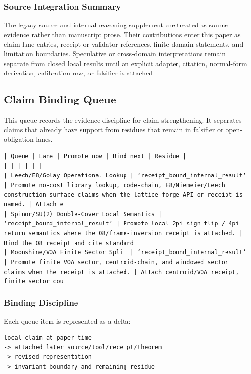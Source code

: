 \documentclass[11pt]{article}
\begin{document}
\subsubsection*{Source Integration Summary}

The legacy source and internal reasoning supplement are treated as source
evidence rather than manuscript prose. Their contributions enter this paper as
claim-lane entries, receipt or validator references, finite-domain statements,
and limitation boundaries. Speculative or cross-domain interpretations remain
separate from closed local results until an explicit adapter, citation,
normal-form derivation, calibration row, or falsifier is attached.
\subsection*{Claim Binding Queue}

This queue records the evidence discipline for claim strengthening. It separates claims that already have support from residues that remain in falsifier or open-obligation lanes.

\noindent\texttt{| Queue | Lane | Promote now | Bind next | Residue |}\\
\noindent\texttt{|---|---|---|---|---|}\\
\noindent\texttt{| Leech/E8/Golay Operational Lookup | `receipt\_bound\_internal\_result` | Promote no-cost library lookup, code-chain, E8/Niemeier/Leech construction-surface claims when the lattice-forge API or receipt is named. | Attach e}\\
\noindent\texttt{| Spinor/SU(2) Double-Cover Local Semantics | `receipt\_bound\_internal\_result` | Promote local 2pi sign-flip / 4pi return semantics where the O8/frame-inversion receipt is attached. | Bind the O8 receipt and cite standard}\\
\noindent\texttt{| Moonshine/VOA Finite Sector Split | `receipt\_bound\_internal\_result` | Promote finite VOA sector, centroid-chain, and windowed sector claims when the receipt is attached. | Attach centroid/VOA receipt, finite sector cou}\\

\subsubsection*{Binding Discipline}

Each queue item is represented as a delta:

\begin{verbatim}
local claim at paper time
-> attached later source/tool/receipt/theorem
-> revised representation
-> invariant boundary and remaining residue
\end{verbatim}
\end{document}
